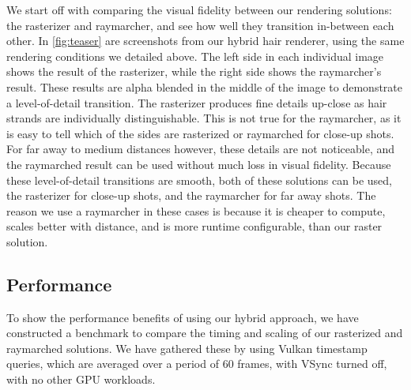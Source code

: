 \documentclass{egpubl}
\begin{document}

We start off with comparing the visual fidelity between our rendering solutions: the rasterizer and raymarcher, and see how well they transition in-between each other. In \cref{fig:teaser} are screenshots from our hybrid hair renderer, using the same rendering conditions we detailed above. The left side in each individual image shows the result of the rasterizer, while the right side shows the raymarcher's result. These results are alpha blended in the middle of the image to demonstrate a level-of-detail transition. The rasterizer produces fine details up-close as hair strands are individually distinguishable. This is not true for the raymarcher, as it is easy to tell which of the sides are rasterized or raymarched for close-up shots. For far away to medium distances however, these details are not noticeable, and the raymarched result can be used without much loss in visual fidelity. Because these level-of-detail transitions are smooth, both of these solutions can be used, the rasterizer for close-up shots, and the raymarcher for far away shots. The reason we use a raymarcher in these cases is because it is cheaper to compute, scales better with distance, and is more runtime configurable, than our raster solution.


\subsection{Performance} \label{sec:performance}


To show the performance benefits of using our hybrid approach, we have constructed a benchmark to compare the timing and scaling of our rasterized and raymarched solutions. We have gathered these by using Vulkan timestamp queries, which are averaged over a period of 60 frames, with VSync turned off, with no other GPU workloads.
\end{document}
